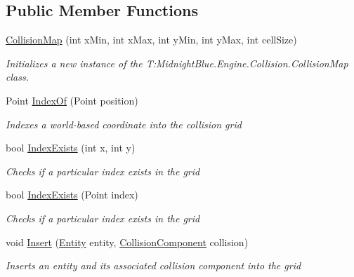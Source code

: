 \subsection*{Public Member Functions}
\begin{DoxyCompactItemize}
\item 
\hyperlink{class_midnight_blue_1_1_engine_1_1_collision_1_1_collision_map_ac0f2a2ca0e0dc469d86cef325c6e20ac}{Collision\+Map} (int x\+Min, int x\+Max, int y\+Min, int y\+Max, int cell\+Size)
\begin{DoxyCompactList}\small\item\em Initializes a new instance of the T\+:\+Midnight\+Blue.\+Engine.\+Collision.\+Collision\+Map class. \end{DoxyCompactList}\item 
Point \hyperlink{class_midnight_blue_1_1_engine_1_1_collision_1_1_collision_map_a994b7b33c4573726782cdbcbad785c93}{Index\+Of} (Point position)
\begin{DoxyCompactList}\small\item\em Indexes a world-\/based coordinate into the collision grid \end{DoxyCompactList}\item 
bool \hyperlink{class_midnight_blue_1_1_engine_1_1_collision_1_1_collision_map_af68316c70c60b8b8bfa5cb47f824a5da}{Index\+Exists} (int x, int y)
\begin{DoxyCompactList}\small\item\em Checks if a particular index exists in the grid \end{DoxyCompactList}\item 
bool \hyperlink{class_midnight_blue_1_1_engine_1_1_collision_1_1_collision_map_a5adaed6c764ad94ad8ceca07631cbd93}{Index\+Exists} (Point index)
\begin{DoxyCompactList}\small\item\em Checks if a particular index exists in the grid \end{DoxyCompactList}\item 
void \hyperlink{class_midnight_blue_1_1_engine_1_1_collision_1_1_collision_map_ac5effff2c812f658296f7eb5d80b8baf}{Insert} (\hyperlink{class_midnight_blue_1_1_engine_1_1_entity_component_1_1_entity}{Entity} entity, \hyperlink{class_midnight_blue_1_1_engine_1_1_entity_component_1_1_collision_component}{Collision\+Component} collision)
\begin{DoxyCompactList}\small\item\em Inserts an entity and its associated collision component into the grid \end{DoxyCompactList}\item 

\end{DoxyCompactItemize}

